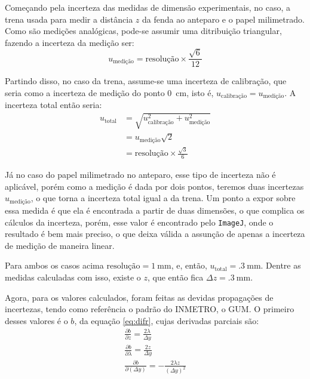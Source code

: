 Começando pela incerteza das medidas de dimensão experimentais, no caso, a trena usada para medir a distância $z$ da fenda ao anteparo e o papel milimetrado. Como são medições analógicas, pode-se assumir uma ditribuição triangular, fazendo a incerteza da medição ser:
\begin{equation*}
    u_\text{medição} = \text{resolução} \times \frac{\sqrt{6}}{12}
\end{equation*}

Partindo disso, no caso da trena, assume-se uma incerteza de calibração, que seria como a incerteza de medição do ponto \SI{0}{\centi\meter}, isto é, $u_\text{calibração} = u_\text{medição}$. A incerteza total então seria:
\begin{align*}
    u_\text{total}
        &= \sqrt{u_\text{calibração}^2 + u_\text{medição}^2} \\
        &= u_\text{medição} \sqrt{2} \\
        &= \text{resolução} \times \frac{\sqrt{3}}{6}
\end{align*}

Já no caso do papel milimetrado no anteparo, esse tipo de incerteza não é aplicável, porém como a medição é dada por dois pontos, teremos duas incertezas $u_\text{medição}$, o que torna a incerteza total igual a da trena. Um ponto a expor sobre essa medida é que ela é encontrada a partir de duas dimensões, o que complica os cálculos da incerteza, porém, esse valor é encontrado pelo \texttt{ImageJ}\cite{ref:imagej}, onde o resultado é bem mais preciso, o que deixa válida a assunção de apenas a incerteza de medição de maneira linear.

Para ambos os casos acima $\text{resolução} = \SI{1}{\milli\meter}$, e, então, $u_\text{total} = \SI{.3}{\milli\meter}$. Dentre as medidas calculadas com isso, existe o $z$, que então fica $\Delta z = \SI{.3}{\milli\meter}$.

Agora, para os valores calculados, foram feitas as devidas propagações de incertezas, tendo como referência o padrão do INMETRO, o GUM\cite{ref:gum}. O primeiro desses valores é o $b$, da equação \ref{eq:difr}, cujas derivadas parciais são:
\begin{gather*}
    \frac{\partial b}{\partial z} = \frac{2 \lambda}{\Delta y} \\
    \frac{\partial b}{\partial \lambda} = \frac{2 z}{\Delta y} \\
    \frac{\partial b}{\partial (\Delta y)} = -\frac{2 \lambda z}{(\Delta y)^2}
\end{gather*}

